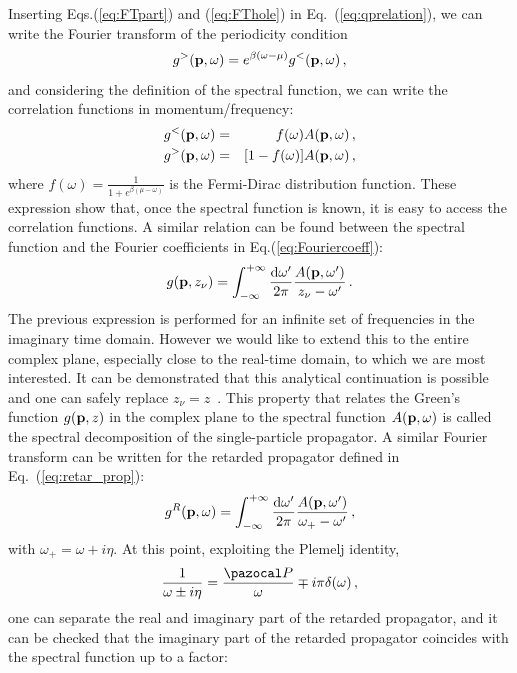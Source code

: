 Inserting Eqs.(\ref{eq:FTpart}) and (\ref{eq:FThole}) in Eq.~(\ref{eq:qprelation}), we can write the Fourier transform of the periodicity condition
\begin{equation}
g^>({\bf p},\omega)=e^{\beta(\omega-\mu)}g^<({\bf p},\omega)\,,
\end{equation}
and considering the definition of the spectral function, we can write the correlation functions in momentum/frequency:
\begin{eqnarray}
\label{eq:FTpart_spec}
g^<({\bf p},\omega) &=& f(\omega)A({\bf p},\omega)\,,\\
\label{eq:FThole_spec}
g^>({\bf p},\omega) &=&[1-f(\omega)]A({\bf p},\omega)\,,
\end{eqnarray}
where $f(\omega)=\frac{1}{1+e^{\beta(\mu-\omega)}}$ is the Fermi-Dirac distribution function. These expression show that, once the spectral function is known, it is easy to access the correlation functions. A similar relation can be found between the spectral function and the Fourier coefficients in Eq.(\ref{eq:Fouriercoeff}):
 \begin{equation}
\label{eq:FT_fullprop}
g({\bf p},z_\nu)=\int^{+\infty}_{-\infty} \frac{{\rm d}\omega'}{2\pi} \frac{A({\bf p},\omega')}{z_\nu-\omega'}\,.
\end{equation}
The previous expression is performed for an infinite set of frequencies in the imaginary time domain. However we would like to extend this to the entire complex plane, especially close to the real-time domain, to which we are most interested. It can be demonstrated that this analytical continuation is possible and one can safely replace $z_\nu=z$~\cite{ch11_Baym1961}. This property that relates the Green's function $g({\bf p},z)$ in the complex plane to the spectral function $A({\bf p},\omega)$ is called the spectral decomposition of the single-particle propagator. A similar Fourier transform can be written for the retarded propagator defined in Eq.~(\ref{eq:retar_prop}):
 \begin{equation}
\label{eq:FT_retarprop}
g^R({\bf p},\omega)=\int^{+\infty}_{-\infty} \frac{{\rm d}\omega'}{2\pi} \frac{A({\bf p},\omega')}{\omega_+-\omega'}\,,
\end{equation}
with $\omega_+=\omega+i\eta$. At this point, exploiting the Plemelj identity,
\begin{equation}
\frac{1}{\omega\pm i\eta}=\frac{\pazocal P}{\omega}\mp i\pi\delta(\omega)\,,
\end{equation}
one can separate the real and imaginary part of the retarded propagator, and it can be checked that the imaginary part of the retarded propagator coincides with the spectral function up to a factor:
